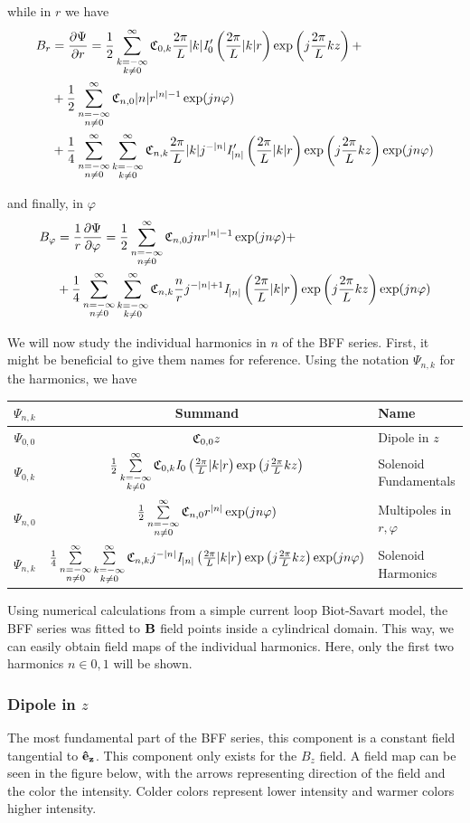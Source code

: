 while in $r$ we have
\begin{equation}
    \begin{split}
        B_r &= \frac{\partial \Psi}{\partial r} =
        \Bffrok + \\ &+ \Bffrno \\ &+\Bffrnk
    \end{split}
\end{equation}

and finally, in $\varphi$
\begin{equation}
    \begin{split}
        B_\varphi &= \frac{1}{r}
        \frac{\partial \Psi}{\partial \varphi} = \Bffpno +\\
        &+ \Bffpnk
    \end{split}
\end{equation}

We will now study the individual harmonics in $n$ of the
BFF series. First, it might be beneficial to give them 
names for reference. Using the notation $\Psi_{n,k}$
for the harmonics, we have

\begin{center}
    \begin{tabular}{c c p{2cm}}
        $\Psi_{n,k}$ & Summand & Name \\ \hline
        $\Psi_{0,0}$ & $\Cnk[0,0]z$ & Dipole in $z$ \\
        $\Psi_{0,k}$ & $\Bffok$ & Solenoid Fundamentals \\
        $\Psi_{n,0}$ & $\Bffno$ & Multipoles in $r, \varphi$ \\
        $\Psi_{n,k}$ & $\Bffnk$ & Solenoid Harmonics
    \end{tabular}
\end{center}

Using numerical calculations from a simple current loop 
Biot-Savart model, the BFF series was fitted to $\vb{B}$
field points inside a cylindrical domain. This way, we
can easily obtain field maps of the individual harmonics.
Here, only the first two harmonics $n\in{0,1}$ will be 
shown.

\subsubsection{Dipole in $z$}
The most fundamental part of the BFF series, this component
is a constant field tangential to $\ez$. This component
only exists for the $B_z$ field. A field map can 
be seen in the figure below, with the arrows representing
direction of the field and the color the intensity. Colder
colors represent lower intensity and warmer colors higher
intensity.

